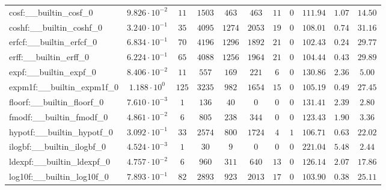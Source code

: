 \begin{tabular}{|l|c|c|c|c|c|c|c|c|c|c|}
cosf:\_\_builtin\_cosf\_0                 & $ 9.826 \cdot 10^{-2} $ & $ 11     $ & $ 1503  $ & $ 463   $ & $ 463   $ & $ 11  $ & $ 0 $ & $ 111.94      $ & $ 1.07    $ & $ 14.50   $ \\
coshf:\_\_builtin\_coshf\_0               & $ 3.240 \cdot 10^{-1} $ & $ 35     $ & $ 4095  $ & $ 1274  $ & $ 2053  $ & $ 19  $ & $ 0 $ & $ 108.01      $ & $ 0.74    $ & $ 31.16   $ \\
erfcf:\_\_builtin\_erfcf\_0               & $ 6.834 \cdot 10^{-1} $ & $ 70     $ & $ 4196  $ & $ 1296  $ & $ 1892  $ & $ 21  $ & $ 0 $ & $ 102.43      $ & $ 0.24    $ & $ 29.77   $ \\
erff:\_\_builtin\_erff\_0                 & $ 6.224 \cdot 10^{-1} $ & $ 65     $ & $ 4088  $ & $ 1256  $ & $ 1964  $ & $ 21  $ & $ 0 $ & $ 104.44      $ & $ 0.43    $ & $ 29.89   $ \\
expf:\_\_builtin\_expf\_0                 & $ 8.406 \cdot 10^{-2} $ & $ 11     $ & $ 557   $ & $ 169   $ & $ 221   $ & $ 6   $ & $ 0 $ & $ 130.86      $ & $ 2.36    $ & $ 5.00    $ \\
expm1f:\_\_builtin\_expm1f\_0             & $ 1.188 \cdot 10^{0}  $ & $ 125    $ & $ 3235  $ & $ 982   $ & $ 1654  $ & $ 15  $ & $ 0 $ & $ 105.19      $ & $ 0.49    $ & $ 27.45   $ \\
floorf:\_\_builtin\_floorf\_0             & $ 7.610 \cdot 10^{-3} $ & $ 1      $ & $ 136   $ & $ 40    $ & $ 0     $ & $ 0   $ & $ 0 $ & $ 131.41      $ & $ 2.39    $ & $ 2.80    $ \\
fmodf:\_\_builtin\_fmodf\_0               & $ 4.861 \cdot 10^{-2} $ & $ 6      $ & $ 805   $ & $ 238   $ & $ 344   $ & $ 0   $ & $ 0 $ & $ 123.43      $ & $ 1.90    $ & $ 3.36    $ \\
hypotf:\_\_builtin\_hypotf\_0             & $ 3.092 \cdot 10^{-1} $ & $ 33     $ & $ 2574  $ & $ 800   $ & $ 1724  $ & $ 4   $ & $ 1 $ & $ 106.71      $ & $ 0.63    $ & $ 22.02   $ \\
ilogbf:\_\_builtin\_ilogbf\_0             & $ 4.524 \cdot 10^{-3} $ & $ 1      $ & $ 30    $ & $ 9     $ & $ 0     $ & $ 0   $ & $ 0 $ & $ 221.04      $ & $ 5.48    $ & $ 2.44    $ \\
ldexpf:\_\_builtin\_ldexpf\_0             & $ 4.757 \cdot 10^{-2} $ & $ 6      $ & $ 960   $ & $ 311   $ & $ 640   $ & $ 13  $ & $ 0 $ & $ 126.14      $ & $ 2.07    $ & $ 17.86   $ \\
log10f:\_\_builtin\_log10f\_0             & $ 7.893 \cdot 10^{-1} $ & $ 82     $ & $ 2893  $ & $ 923   $ & $ 2013  $ & $ 17  $ & $ 0 $ & $ 103.90      $ & $ 0.38    $ & $ 25.11   $ \\

\end{tabular}
